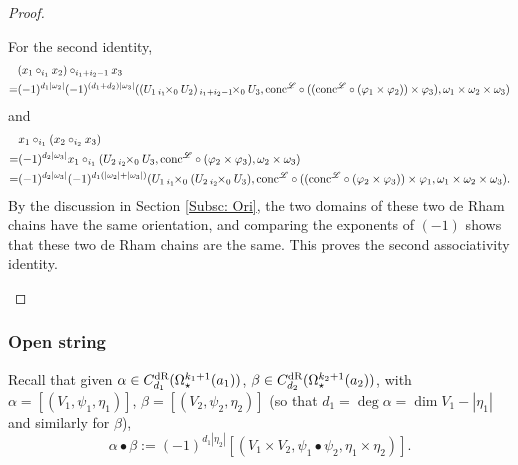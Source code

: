 \documentclass[10pt]{amsart}
\numberwithin{equation}{section}
\theoremstyle{plain}
\theoremstyle{definition}
\theoremstyle{remark}
\numberwithin{equation}{section}
\newcommand{\dR}{\textup{dR}}
\newcommand{\fiberprod}[2]{\,_{#1}\!\!\times_{#2} }
\newcommand{\conc}{\textup{conc}^\mathscr{L}}
\begin{document}
{\begin{proof}
\begin{enumerate}
	For the second identity, 
	\begin{align*}
		&(x_1\circ_{i_1} x_2)\circ_{i_1+i_2-1}x_3 \\
		=& (-1)^{d_1|\omega_2|}(-1)^{(d_1+d_2)|\omega_3|}((U_1\fiberprod{i_1}{0}U_2 )\fiberprod{i_1+i_2-1}{0}U_3,\conc\circ((\conc\circ (\varphi_1\times \varphi_2))\times \varphi_3) , \omega_1\times \omega_2\times \omega_3)
	\end{align*}
	and 
	\begin{align*}
		&x_1\circ_{i_1} (x_2\circ_{i_2}x_3) \\
		=& (-1)^{d_2|\omega_3|}x_1\circ_{i_1}(U_2\fiberprod{i_2}{0}U_3, \conc\circ(\varphi_2\times \varphi_3), \omega_2\times \omega_3)\\
		=& (-1)^{d_2|\omega_3|}(-1)^{d_1(|\omega_2|+|\omega_3|)}(U_1\fiberprod{i_1}{0}(U_2\fiberprod{i_2}{0} U_3), \conc\circ((\conc\circ(\varphi_2\times \varphi_3))\times \varphi_1, \omega_1\times \omega_2\times \omega_3).
	\end{align*}
	By the discussion in Section \ref{Subsc: Ori},  the two domains of these two de Rham chains have the same orientation, and comparing the exponents of $(-1)$ shows that these two de Rham chains are the same. This proves the second associativity identity.
	\end{enumerate}
\end{proof}

\subsubsection{Open string}\label{Subsubsc: SignOpenString}  
Recall that given $\alpha \in C_{d_1}^\dR(\Omega^{k_1+1}_\star(a_1))$, $\beta\in C_{d_2}^\dR(\Omega^{k_2+1}_\star(a_2))$, with $\alpha=[(V_1,\psi_1,\eta_1)]$, $\beta = [(V_2,\psi_2,\eta_2)]$ (so that $d_1=\deg\alpha=\dim V_1-|\eta_1|$ and similarly for $\beta$),
\[
	\alpha\bullet \beta:= (-1)^{d_1|\eta_2|} [(V_1\times V_2, \psi_1\bullet \psi_2, \eta_1\times \eta_2)].
\]

}
\end{document}
